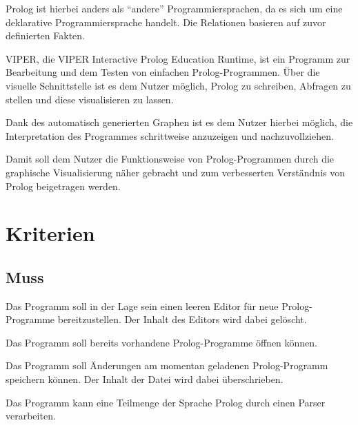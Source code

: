\documentclass[parskip=full,11pt,twoside]{scrartcl}
\begin{document}
Prolog ist hierbei anders als \enquote{andere} Programmiersprachen, da es sich um eine deklarative Programmiersprache handelt. Die Relationen basieren auf zuvor definierten Fakten.

VIPER, die VIPER Interactive Prolog Education Runtime, ist ein Programm zur Bearbeitung und dem Testen von einfachen Prolog-Programmen. Über die visuelle Schnittstelle ist es dem Nutzer möglich, Prolog zu schreiben, Abfragen zu stellen und diese visualisieren zu lassen.

Dank des automatisch generierten Graphen ist es dem Nutzer hierbei möglich, die Interpretation des Programmes schrittweise anzuzeigen und nachzuvollziehen.

Damit soll dem Nutzer die Funktionsweise von Prolog-Programmen durch die graphische Visualisierung näher gebracht und zum verbesserten Verständnis von Prolog beigetragen werden.

\pagebreak
\section{Kriterien}

\subsection{Muss}


Das Programm soll in der Lage sein einen leeren Editor für neue Prolog-Programme bereitzustellen. Der Inhalt des Editors wird dabei gelöscht.


Das Programm soll bereits vorhandene Prolog-Programme öffnen können.


Das Programm soll Änderungen am momentan geladenen Prolog-Programm speichern können. Der Inhalt der Datei wird dabei überschrieben.


Das Programm kann eine Teilmenge der Sprache Prolog durch einen Parser verarbeiten.

\end{document}
